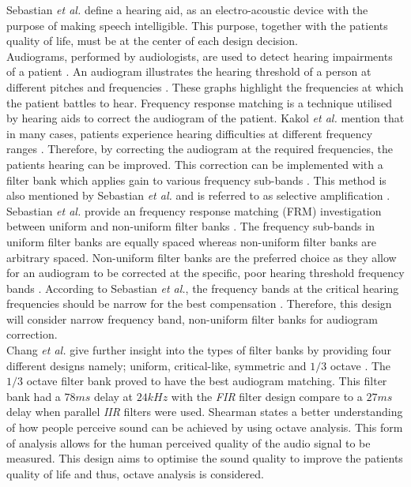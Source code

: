 \documentclass[12pt, onecolumn]{article}
\begin{document}
\noindent Sebastian \textit{et al.} \cite{sebastian} define a hearing aid, as an electro-acoustic device with the purpose of making speech intelligible. This purpose, together with the patients quality of life, must be at the center of each design decision.\\
\newline
\noindent Audiograms, performed by audiologists, are used to detect hearing impairments of a patient \cite{audiogram}. An audiogram illustrates the hearing threshold of a person at different pitches and frequencies \cite{sebastian}. These graphs highlight the frequencies at which the patient battles to hear. Frequency response matching is a technique utilised by hearing aids to correct the audiogram of the patient. Kakol \textit{et al.} mention that in many cases, patients experience hearing difficulties at different frequency ranges \cite{diffMeth}. Therefore, by correcting the audiogram at the required frequencies, the patients hearing can be improved. This correction can be implemented with a filter bank which applies gain to various frequency sub-bands \cite{diffMeth}. This method is also mentioned by Sebastian \textit{et al.} and is referred to as selective amplification \cite{sebastian}.\\
\newline
\noindent Sebastian \textit{et al.} provide an frequency response matching (FRM) investigation between uniform and non-uniform filter banks \cite{sebastian}. The frequency sub-bands in uniform filter banks are equally spaced whereas non-uniform filter banks are arbitrary spaced. Non-uniform filter banks are the preferred choice as they allow for an audiogram to be corrected at the specific, poor hearing threshold frequency bands \cite{sebastian}. According to Sebastian \textit{et al.}, the frequency bands at the critical hearing frequencies should be narrow for the best compensation \cite{sebastian}. Therefore, this design will consider narrow frequency band, non-uniform filter banks for audiogram correction. \\
\newline
\noindent Chang \textit{et al.} give further insight into the types of filter banks by providing four different designs namely; uniform, critical-like, symmetric and $1/3$ octave \cite{chang}. The $1/3$ octave filter bank proved to have the best audiogram matching. This filter bank had a $78ms$ delay at $24kHz$ with the \textit{FIR} filter design compare to a $27ms$ delay when parallel \textit{IIR} filters were used. Shearman \cite{octave} states a better understanding of how people perceive sound can be achieved by using octave analysis. This form of analysis allows for the human perceived quality of the audio signal to be measured. This design aims to optimise the sound quality to improve the patients quality of life and thus, octave analysis is considered.\\
\end{document}
